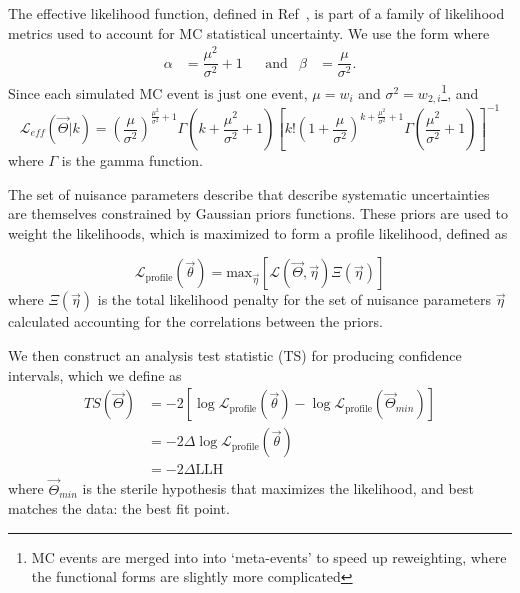 \documentclass[main.tex]{subfiles}
\begin{document}
The effective likelihood function, defined in Ref~\cite{effective_llh}, is part of a family of likelihood metrics used to account for MC statistical uncertainty. 
We use the form where
\begin{align}
    \alpha&=\dfrac{\mu^{2}}{\sigma^{2}} +1 & &\text{and} & \beta&=\dfrac{\mu}{\sigma^{2}}.
\end{align}
Since each simulated MC event is just one event, $\mu = w_{i}$ and $\sigma^{2} = w_{2,i}$\footnote{MC events are merged into into `meta-events' to speed up reweighting, where the functional forms are slightly more complicated}, and
\begin{equation}
    \mathcal{L}_{eff}(\vec{\Theta} | k) = \left(\dfrac{\mu}{\sigma^{2}}\right)^{\tfrac{\mu^{2}}{\sigma^{2}} + 1} \Gamma\left(k + \dfrac{\mu^{2}}{\sigma^{2}} + 1\right) \left[ k! \left(1+\dfrac{\mu}{\sigma^{2}}\right)^{k+\tfrac{\mu^{2}}{\sigma^{2}} + 1} \Gamma\left(\dfrac{\mu^{2}}{\sigma^{2}} +1\right)\right]^{-1}
\end{equation}
where $\Gamma$ is the gamma function. 

The set of nuisance parameters describe that describe systematic uncertainties are themselves constrained by Gaussian priors functions. 
These priors are used to weight the likelihoods, which is maximized to form a profile likelihood, defined as 

\begin{equation}
\mathcal{L}_{\text{profile}}\left(\vec{\theta}\right) = \text{max}_{\vec{\eta}}\left[\mathcal{L}(\vec{\Theta}, \vec{\eta}) \Xi(\vec{\eta}) \right]
\end{equation}
where $\Xi(\vec{\eta})$ is the total likelihood penalty for the set of nuisance parameters $\vec{\eta}$ calculated accounting for the correlations between the priors. 

We then construct an analysis test statistic (TS) for producing confidence intervals, which we define as 
\begin{equation}\begin{split}
TS(\vec{\Theta}) &= -2\left[ \log\mathcal{L}_{\text{profile}}(\vec{\theta}) - \log\mathcal{L}_{\text{profile}}(\vec{\Theta}_{min}) \right] \\
&= -2 \Delta \log\mathcal{L}_{\text{profile}}(\vec{\theta})\\
&=-2\Delta \text{LLH}
\end{split}\end{equation}
where $\vec{\Theta}_{min}$ is the sterile hypothesis that maximizes the likelihood, and best matches the data: the best fit point. 
\end{document}
